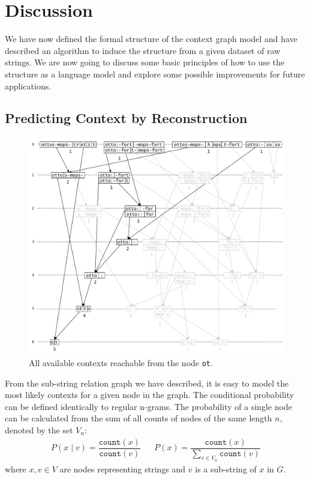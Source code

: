 \chapter{Discussion}\label{chp:discussion}

We have now defined the formal structure of the context graph model and have described an algorithm to induce the structure from a given dataset of raw strings. We are now going to discuss some basic principles of how to use the structure as a language model and explore some possible improvements for future applications.
%
\section{Predicting Context by Reconstruction}
%
\begin{figure}[ht!]
\centering
\hspace{-1cm}
\includegraphics[scale=0.68]{images/ot_subgraph.pdf}
\caption{All available contexts reachable from the node \texttt{ot}.}
\end{figure}
%
\noindent
From the sub-string relation graph we have described, it is easy to model the most likely contexts for a given node in the graph. The conditional probability can be defined identically to regular n-grams.
The probability of a single node can be calculated from the sum of all counts of nodes of the same length $n$, denoted by the set $V_n$:
\begin{align*}
    P(x \mid v) = \dfrac{\texttt{count}(x)}{\texttt{count}(v)} &&
    P(x) = \dfrac{\texttt{count}(x)}{\sum\limits_{v \in V_n}\texttt{count}(v)}
\end{align*}
where $x, v \in V$ are nodes representing strings and $v$ is a sub-string of $x$ in $G$.\par

